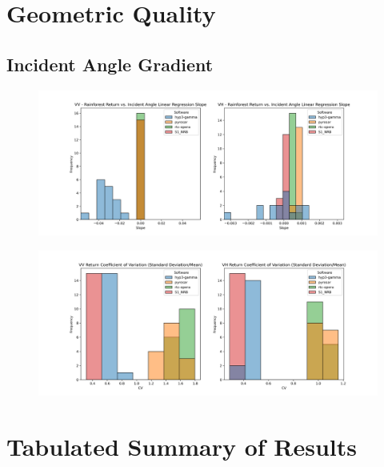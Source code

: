 \documentclass{article}
\begin{document}
\section{Geometric Quality}
\subsection{Incident Angle Gradient}

\begin{figure}[ht]
\centering
\includegraphics[width=\textwidth]{slope.png}
\caption{\label{fig:slope}}
\end{figure}

\begin{figure}[ht]
\centering
\includegraphics[width=\textwidth]{CV.png}
\caption{\label{fig:CV}}
\end{figure}

\section{Tabulated Summary of Results}
\end{document}
